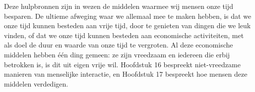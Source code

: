 Deze hulpbronnen zijn in wezen de middelen waarmee wij mensen onze tijd
besparen. De ultieme afweging waar we allemaal mee te maken hebben, is
dat we onze tijd kunnen besteden aan vrije tijd, door te genieten van
dingen die we leuk vinden, of dat we onze tijd kunnen besteden aan
economische activiteiten, met als doel de duur en waarde van onze tijd
te vergroten. Al deze economische middelen hebben één ding gemeen: ze
zijn vreedzaam en iedereen die erbij betrokken is, is dit uit eigen
vrije wil. Hoofdstuk 16 bespreekt niet-vreedzame manieren van menselijke
interactie, en Hoofdstuk 17 bespreekt hoe mensen deze middelen
verdedigen.
